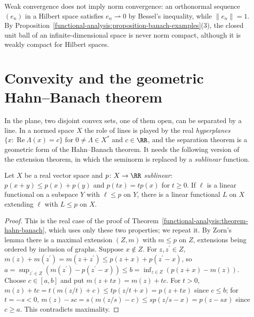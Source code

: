 \begin{counterexample}\label{functional-analysis:counterexample-weak}
Weak convergence does not imply norm convergence: an orthonormal sequence $(e_n)$ in a Hilbert space satisfies $e_n \rightharpoonup 0$ by Bessel's inequality, while $\|e_n\| = 1$. By
Proposition~\ref{functional-analysis:proposition-banach-examples}(3), the closed unit ball of an infinite-dimensional space is never norm compact, although it is weakly compact for Hilbert spaces.
\end{counterexample}

\section{Convexity and the geometric Hahn--Banach theorem}\label{functional-analysis:section-separation}

In the plane, two disjoint convex sets, one of them open, can be separated by a line. In a normed space $X$ the role of lines is played by the real \emph{hyperplanes}
$\{x : \operatorname{Re}\Lambda(x) = c\}$ for $0 \neq \Lambda \in X^*$ and $c \in \RR$, and the separation theorem is a geometric form of the Hahn--Banach theorem. It needs the following version of the extension
theorem, in which the seminorm is replaced by a \emph{sublinear} function.

\begin{lemma}\label{functional-analysis:lemma-sublinear-extension}
Let $X$ be a real vector space and $p \colon X \to \RR$ \emph{sublinear}: $p(x + y) \leq p(x) + p(y)$ and $p(tx) = tp(x)$ for $t \geq 0$. If $\ell$ is a linear functional on a subspace $Y$ with $\ell \leq p$ on $Y$,
there is a linear functional $L$ on $X$ extending $\ell$ with $L \leq p$ on $X$.
\end{lemma}

\begin{proof}
This is the real case of the proof of Theorem~\ref{functional-analysis:theorem-hahn-banach}, which uses only these two properties; we repeat it. By Zorn's lemma there is a maximal extension $(Z, m)$ with
$m \leq p$ on $Z$, extensions being ordered by inclusion of graphs. Suppose $x \notin Z$. For $z, z^{\prime} \in Z$, $m(z) + m(z^{\prime}) = m(z + z^{\prime}) \leq p(z + x) + p(z^{\prime} - x)$, so
$a = \sup_{z^{\prime} \in Z}(m(z^{\prime}) - p(z^{\prime} - x)) \leq b = \inf_{z \in Z}(p(z + x) - m(z))$. Choose $c \in [a, b]$ and put $m(z + tx) = m(z) + tc$. For $t > 0$,
$m(z) + tc = t(m(z/t) + c) \leq tp(z/t + x) = p(z + tx)$ since $c \leq b$; for $t = -s < 0$, $m(z) - sc = s(m(z/s) - c) \leq sp(z/s - x) = p(z - sx)$ since $c \geq a$. This contradicts maximality.
\end{proof}

